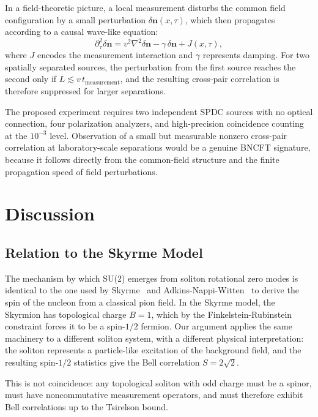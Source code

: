 ﻿\documentclass[11pt,a4paper]{article}
\begin{document}
In a field-theoretic picture, a local measurement disturbs the common field configuration by a small perturbation $\delta\mathbf{n}(x,\tau)$, which then propagates according to a causal wave-like equation:
\begin{equation}
\partial_\tau^2 \delta\mathbf{n} = v^2 \nabla^2 \delta\mathbf{n} - \gamma\,\delta\mathbf{n} + J(x,\tau),
\end{equation}
where $J$ encodes the measurement interaction and $\gamma$ represents damping. For two spatially separated sources, the perturbation from the first source reaches the second only if $L \lesssim v\, t_{\text{measurement}}$, and the resulting cross-pair correlation is therefore suppressed for larger separations.

The proposed experiment requires two independent SPDC sources with no optical connection, four polarization analyzers, and high-precision coincidence counting at the $10^{-3}$ level. Observation of a small but measurable nonzero cross-pair correlation at laboratory-scale separations would be a genuine BNCFT signature, because it follows directly from the common-field structure and the finite propagation speed of field perturbations.
\section{Discussion}

\subsection{Relation to the Skyrme Model}

The mechanism by which SU(2) emerges from soliton rotational zero modes is identical to the one used by Skyrme~\cite{skyrme1962} and Adkins-Nappi-Witten~\cite{anw1983} to derive the spin of the nucleon from a classical pion field. In the Skyrme model, the Skyrmion has topological charge $B = 1$, which by the Finkelstein-Rubinstein constraint forces it to be a spin-$1/2$ fermion. Our argument applies the same machinery to a different soliton system, with a different physical interpretation: the soliton represents a particle-like excitation of the background field, and the resulting spin-$1/2$ statistics give the Bell correlation $S = 2\sqrt{2}$.

This is not coincidence: any topological soliton with odd charge must be a spinor, must have noncommutative measurement operators, and must therefore exhibit Bell correlations up to the Tsirelson bound.
\end{document}
